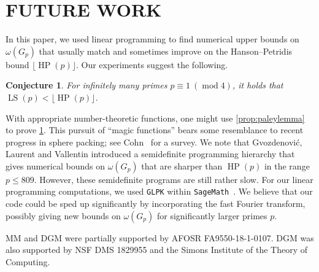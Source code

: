 \documentclass[]{spie}  %
\newtheorem{conj}[thm]{Conjecture}
\begin{document}
\section{FUTURE WORK}
In this paper, we used linear programming to find numerical upper bounds on $\omega(G_p)$ that usually match and sometimes improve on the Hanson--Petridis bound $\lfloor \operatorname{HP}(p) \rfloor$.  Our experiments suggest the following.

\begin{conj}\label{conj:wewin}
For infinitely many primes $p \equiv 1~(\operatorname{mod}4)$, it holds that $\operatorname{LS}(p) < \lfloor \operatorname{HP}(p) \rfloor$.
\end{conj}

With appropriate number-theoretic functions, one might use \cref{prop:paleylemma} to prove \cref{conj:wewin}.
This pursuit of ``magic functions'' bears some resemblance to recent progress in sphere packing; see Cohn~\cite{cohn17} for a survey.
We note that Gvozdenovi\'{c}, Laurent and Vallentin\cite{gvoz09} introduced a semidefinite programming hierarchy that gives numerical bounds on $\omega(G_p)$ that are sharper than $\operatorname{HP}(p)$ in the range $p \leq 809$.  However, these semidefinite programs are still rather slow.
For our linear programming computations, we used \texttt{GLPK} within \texttt{SageMath}~\cite{sage}.  We believe that our code could be sped up significantly by incorporating the fast Fourier transform\cite{vanderbei12}, possibly giving new bounds on $\omega(G_p)$ for significantly larger primes $p$.



\acknowledgments %
 
MM and DGM were partially supported by AFOSR FA9550-18-1-0107.
DGM was also supported by NSF DMS 1829955 and the Simons Institute of the Theory of Computing.



\end{document}
